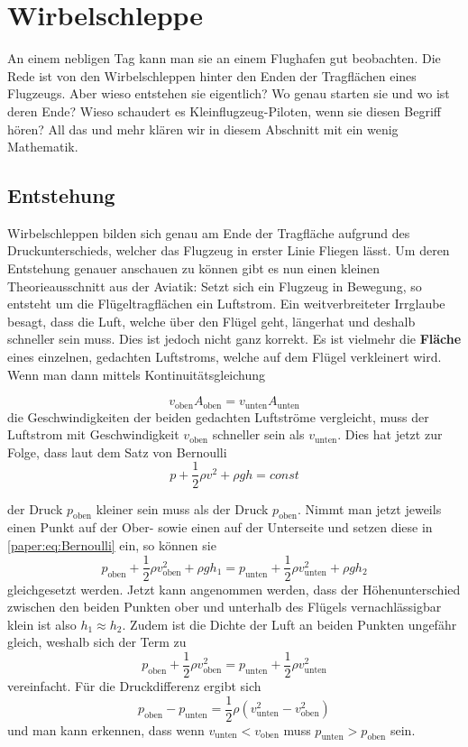 %
%
%
\section{Wirbelschleppe}
An einem nebligen Tag kann man sie an einem Flughafen gut beobachten. 
Die Rede ist von den Wirbelschleppen hinter den Enden der Tragflächen eines Flugzeugs.
Aber wieso entstehen sie eigentlich? 
Wo genau starten sie und wo ist deren Ende?
Wieso schaudert es Kleinflugzeug-Piloten, wenn sie diesen Begriff hören?
All das und mehr klären wir in diesem Abschnitt mit ein wenig Mathematik.

\subsection{Entstehung}
Wirbelschleppen bilden sich genau am Ende der Tragfläche aufgrund des Druckunterschieds, welcher das Flugzeug in erster Linie Fliegen lässt.
Um deren Entstehung genauer anschauen zu können gibt es nun einen kleinen Theorieausschnitt aus der Aviatik:
Setzt sich ein Flugzeug in Bewegung, so entsteht um die Flügeltragflächen ein Luftstrom.
Ein weitverbreiteter Irrglaube besagt, dass die Luft, welche über den Flügel geht, \glqq länger\grqq hat und deshalb schneller sein muss.
Dies ist jedoch nicht ganz korrekt.
Es ist vielmehr die \textbf{Fläche} eines einzelnen, gedachten Luftstroms, welche auf dem Flügel verkleinert wird.%
Wenn man dann mittels Kontinuitätsgleichung

\[
v_{\text{oben}}A_{\text{oben}} 
=
v_{\text{unten}}A_{\text{unten}}
\]
die Geschwindigkeiten der beiden gedachten Luftströme vergleicht, muss der Luftstrom mit Geschwindigkeit $v_{\text{oben}}$ schneller sein als $v_{\text{unten}}$.
Dies hat jetzt zur Folge, dass laut dem Satz von Bernoulli 
\begin{equation}
    p+\frac{1}{2}\rho v^2+\rho gh
    =
    const
    \label{paper:eq:Bernoulli}
\end{equation}

der Druck $p_{\text{oben}}$ kleiner sein muss als der Druck $p_{\text{oben}}$.
Nimmt man jetzt jeweils einen Punkt auf der Ober- sowie einen auf der Unterseite und setzen diese in \ref{paper:eq:Bernoulli} ein, so können sie 
\[
p_{\text{oben}}+\frac{1}{2}\rho v^2_{\text{oben}} + \rho gh_1 
=
p_{\text{unten}}+\frac{1}{2}\rho v^2_{\text{unten}}+\rho gh_2
\]
gleichgesetzt werden.
Jetzt kann angenommen werden, dass der Höhenunterschied zwischen den beiden Punkten ober und unterhalb des Flügels vernachlässigbar klein ist also \(h_1\approx h_2\).
Zudem ist die Dichte der Luft an beiden Punkten ungefähr gleich, weshalb sich der Term zu 
\[
p_{\text{oben}}+\frac{1}{2}\rho v^2_{\text{oben}} 
=
p_{\text{unten}}+\frac{1}{2}\rho v^2_{\text{unten}}
\]
vereinfacht.
Für die Druckdifferenz ergibt sich
\[
p_{\text{oben}}-p_{\text{unten}} 
=
\frac{1}{2}\rho( v^2_{\text{unten}}-v^2_{\text{oben}})
\]
und man kann erkennen, dass wenn $v_{\text{unten}} < v_{\text{oben}}$ muss $p_{\text{unten}} > p_{\text{oben}}$ sein.

